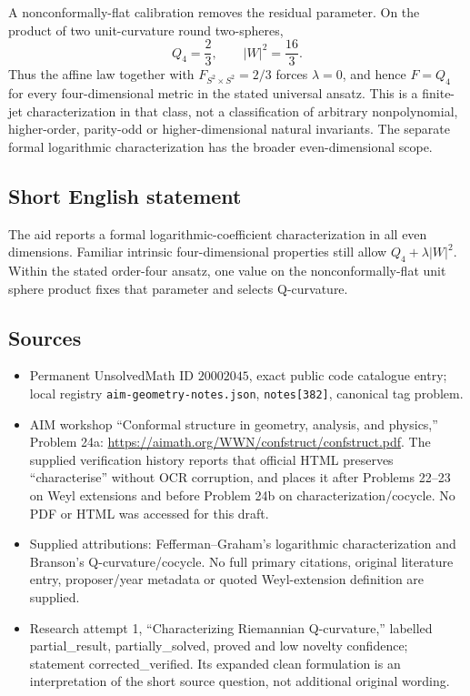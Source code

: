 \documentclass[11pt]{article}
\begin{document}
A nonconformally-flat calibration removes the residual parameter. On the product of two unit-curvature round two-spheres,
\[
 Q_4=\frac23,\qquad |W|^2=\frac{16}{3}.
\]
Thus the affine law together with \(F_{S^2\times S^2}=2/3\) forces \(\lambda=0\), and hence \(F=Q_4\) for every four-dimensional metric in the stated universal ansatz. This is a finite-jet characterization in that class, not a classification of arbitrary nonpolynomial, higher-order, parity-odd or higher-dimensional natural invariants. The separate formal logarithmic characterization has the broader even-dimensional scope.
\subsection{Short English statement}
The aid reports a formal logarithmic-coefficient characterization in all even dimensions. Familiar intrinsic four-dimensional properties still allow \(Q_4+\lambda|W|^2\). Within the stated order-four ansatz, one value on the nonconformally-flat unit sphere product fixes that parameter and selects Q-curvature.
\subsection{Sources}
\begin{itemize}
\item Permanent UnsolvedMath ID \(20002045\), exact public code catalogue entry; local registry \texttt{aim-geometry-notes.json}, \texttt{notes[382]}, canonical tag problem.
\item AIM workshop ``Conformal structure in geometry, analysis, and physics,'' Problem 24a: \url{https://aimath.org/WWN/confstruct/confstruct.pdf}. The supplied verification history reports that official HTML preserves ``characterise'' without OCR corruption, and places it after Problems 22--23 on Weyl extensions and before Problem 24b on characterization/cocycle. No PDF or HTML was accessed for this draft.
\item Supplied attributions: Fefferman--Graham's logarithmic characterization and Branson's Q-curvature/cocycle. No full primary citations, original literature entry, proposer/year metadata or quoted Weyl-extension definition are supplied.
\item Research attempt 1, ``Characterizing Riemannian Q-curvature,'' labelled partial\_result, partially\_solved, proved and low novelty confidence; statement corrected\_verified. Its expanded clean formulation is an interpretation of the short source question, not additional original wording.
\end{itemize}
\end{document}
